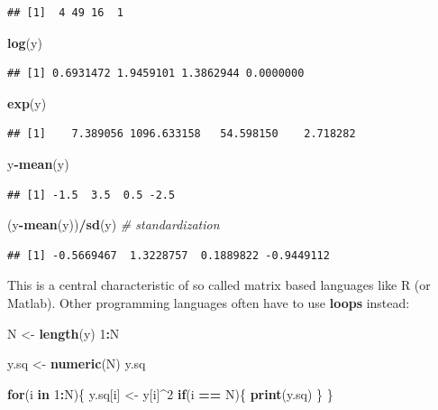 \documentclass[]{book}
\newenvironment{Shaded}{\begin{snugshade}}{\end{snugshade}}
\newcommand{\CommentTok}[1]{\textcolor[rgb]{0.56,0.35,0.01}{\textit{#1}}}
\newcommand{\ControlFlowTok}[1]{\textcolor[rgb]{0.13,0.29,0.53}{\textbf{#1}}}
\newcommand{\DecValTok}[1]{\textcolor[rgb]{0.00,0.00,0.81}{#1}}
\newcommand{\KeywordTok}[1]{\textcolor[rgb]{0.13,0.29,0.53}{\textbf{#1}}}
\newcommand{\NormalTok}[1]{#1}
\newcommand{\OperatorTok}[1]{\textcolor[rgb]{0.81,0.36,0.00}{\textbf{#1}}}
\newcommand{\StringTok}[1]{\textcolor[rgb]{0.31,0.60,0.02}{#1}}
\theoremstyle{definition}
\theoremstyle{definition}
\theoremstyle{definition}
\theoremstyle{remark}
\begin{document}
\begin{verbatim}
## [1]  4 49 16  1
\end{verbatim}

\begin{Shaded}
\begin{Highlighting}[]
\KeywordTok{log}\NormalTok{(y)}
\end{Highlighting}
\end{Shaded}

\begin{verbatim}
## [1] 0.6931472 1.9459101 1.3862944 0.0000000
\end{verbatim}

\begin{Shaded}
\begin{Highlighting}[]
\KeywordTok{exp}\NormalTok{(y)}
\end{Highlighting}
\end{Shaded}

\begin{verbatim}
## [1]    7.389056 1096.633158   54.598150    2.718282
\end{verbatim}

\begin{Shaded}
\begin{Highlighting}[]
\NormalTok{y}\OperatorTok{-}\KeywordTok{mean}\NormalTok{(y)}
\end{Highlighting}
\end{Shaded}

\begin{verbatim}
## [1] -1.5  3.5  0.5 -2.5
\end{verbatim}

\begin{Shaded}
\begin{Highlighting}[]
\NormalTok{(y}\OperatorTok{-}\KeywordTok{mean}\NormalTok{(y))}\OperatorTok{/}\KeywordTok{sd}\NormalTok{(y) }\CommentTok{# standardization }
\end{Highlighting}
\end{Shaded}

\begin{verbatim}
## [1] -0.5669467  1.3228757  0.1889822 -0.9449112
\end{verbatim}

This is a central characteristic of so called matrix based languages like R (or Matlab). Other programming languages often have to use \textbf{loops} instead:

\begin{Shaded}
\begin{Highlighting}[]
\NormalTok{N <-}\StringTok{ }\KeywordTok{length}\NormalTok{(y)}
\DecValTok{1}\OperatorTok{:}\NormalTok{N}

\NormalTok{y.sq <-}\StringTok{ }\KeywordTok{numeric}\NormalTok{(N)}
\NormalTok{y.sq}

\ControlFlowTok{for}\NormalTok{(i }\ControlFlowTok{in} \DecValTok{1}\OperatorTok{:}\NormalTok{N)\{}
\NormalTok{  y.sq[i] <-}\StringTok{ }\NormalTok{y[i]}\OperatorTok{^}\DecValTok{2}
  \ControlFlowTok{if}\NormalTok{(i }\OperatorTok{==}\StringTok{ }\NormalTok{N)\{}
    \KeywordTok{print}\NormalTok{(y.sq)}
\NormalTok{  \}}
\NormalTok{\}}
\end{Highlighting}
\end{Shaded}
\end{document}
